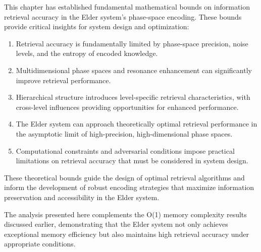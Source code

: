 This chapter has established fundamental mathematical bounds on information retrieval accuracy in the Elder system's phase-space encoding. These bounds provide critical insights for system design and optimization:

\begin{enumerate}
    \item Retrieval accuracy is fundamentally limited by phase-space precision, noise levels, and the entropy of encoded knowledge.
    
    \item Multidimensional phase spaces and resonance enhancement can significantly improve retrieval performance.
    
    \item Hierarchical structure introduces level-specific retrieval characteristics, with cross-level influences providing opportunities for enhanced performance.
    
    \item The Elder system can approach theoretically optimal retrieval performance in the asymptotic limit of high-precision, high-dimensional phase spaces.
    
    \item Computational constraints and adversarial conditions impose practical limitations on retrieval accuracy that must be considered in system design.
\end{enumerate}

These theoretical bounds guide the design of optimal retrieval algorithms and inform the development of robust encoding strategies that maximize information preservation and accessibility in the Elder system.

The analysis presented here complements the O(1) memory complexity results discussed earlier, demonstrating that the Elder system not only achieves exceptional memory efficiency but also maintains high retrieval accuracy under appropriate conditions.